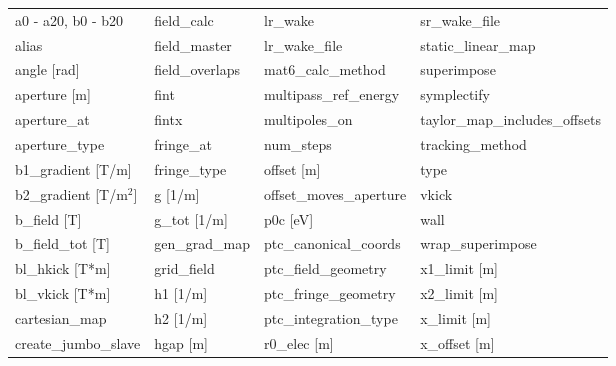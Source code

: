  \begin{tabular}{llll} \toprule
a0 - a20, b0 - b20               & field_calc                       & lr_wake                          & sr_wake_file                     \\
alias                            & field_master                     & lr_wake_file                     & static_linear_map                \\
angle [rad]                      & field_overlaps                   & mat6_calc_method                 & superimpose                      \\
aperture [m]                     & fint                             & multipass_ref_energy             & symplectify                      \\
aperture_at                      & fintx                            & multipoles_on                    & taylor_map_includes_offsets      \\
aperture_type                    & fringe_at                        & num_steps                        & tracking_method                  \\
b1_gradient [T/m]                & fringe_type                      & offset [m]                       & type                             \\
b2_gradient [T/m$^2$]            & g [1/m]                          & offset_moves_aperture            & vkick                            \\
b_field [T]                      & g_tot [1/m]                      & p0c [eV]                         & wall                             \\
b_field_tot [T]                  & gen_grad_map                     & ptc_canonical_coords             & wrap_superimpose                 \\
bl_hkick [T*m]                   & grid_field                       & ptc_field_geometry               & x1_limit [m]                     \\
bl_vkick [T*m]                   & h1 [1/m]                         & ptc_fringe_geometry              & x2_limit [m]                     \\
cartesian_map                    & h2 [1/m]                         & ptc_integration_type             & x_limit [m]                      \\
create_jumbo_slave               & hgap [m]                         & r0_elec [m]                      & x_offset [m]                     \\

\end{tabular}
